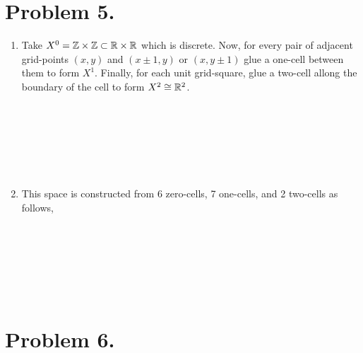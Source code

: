 \documentclass[12pt]{extarticle}
\begin{document}
\section*{Problem 5.}

\begin{enumerate}
\item Take $X^0 = \mathbb{Z} \times \mathbb{Z} \subset \mathbb{R} \times \mathbb{R}$ which is discrete. Now, for every pair of adjacent grid-points $(x, y)$ and $(x \pm 1, y)$ or $(x, y \pm 1)$   glue a one-cell between them to form $X^1$. Finally, for each unit grid-square, glue a two-cell allong the boundary of the cell to form $X^2 \cong \mathbb{R}^2$.  
\bigskip \\
\bigskip \\
\bigskip \\
\bigskip \\ 
\bigskip \\ 
\bigskip \\ 
\bigskip \\ 

\item This space is constructed from 6 zero-cells, 7 one-cells, and 2 two-cells as follows,
\bigskip \\
\bigskip \\
\bigskip \\
\bigskip \\ 
\bigskip \\ 
\bigskip \\ 
\bigskip \\ 
\end{enumerate}

\section*{Problem 6.}
\end{document}
